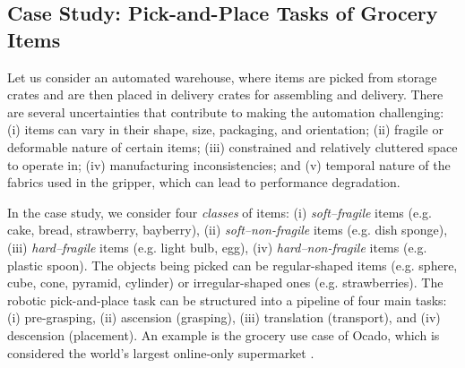 \documentclass[lettersize,journal]{IEEEtran}
\begin{document}
\subsection{Case Study: Pick-and-Place Tasks of Grocery Items}
Let us consider an automated warehouse, where items are picked from storage crates and are then placed in delivery crates for assembling and delivery. 
There are several uncertainties that contribute to making the automation challenging: (i) items can vary in their shape, size, packaging, and orientation; (ii) fragile or deformable nature of certain items; (iii) constrained and relatively cluttered space to operate in; (iv) manufacturing inconsistencies; and (v) temporal nature of the fabrics used in the gripper, which can lead to performance degradation. 

In the case study, we consider four \emph{classes} of items: (i) \emph{soft–fragile} items (e.g. cake, bread, strawberry, bayberry), (ii) \emph{soft–non-fragile} items (e.g. dish sponge), (iii) \emph{hard–fragile} items (e.g. light bulb, egg), (iv) \emph{hard–non-fragile} items (e.g. plastic spoon). 
The objects being picked can be regular-shaped items (e.g. sphere, cube, cone, pyramid, cylinder) or irregular-shaped ones (e.g. strawberries).
The robotic pick-and-place task can be structured into a pipeline of four main tasks: (i) pre-grasping, (ii) ascension (grasping), (iii) translation (transport), and (iv) descension (placement). 
An example is the grocery use case of Ocado, which is considered the world's largest online-only supermarket \cite{Triantafyllou2019, Sotiropoulos2018}. 

\end{document}
